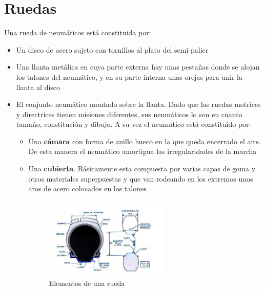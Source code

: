\documentclass[a4paper,12pt,oneside]{book}
\begin{document}
\section{Ruedas}
\label{sec:org46b1482}

Una rueda de neumáticos está constituida por:
\begin{itemize}
\item Un disco de acero sujeto con tornillos al plato del semi-palier
\item Una llanta metálica en cuya parte externa hay unas pestañas donde se alojan
los talones del neumático, y en su parte interna unas orejas para unir la
llanta al disco
\item El conjunto neumático montado sobre la llanta. Dado que las ruedas motrices y
directrices tienen misiones diferentes, sus neumáticos lo son en cuanto
tamaño, constitución y dibujo. A su vez el neumático está constituido por:
\begin{itemize}
\item Una \textbf{cámara} con forma de anillo hueco en la que queda encerrado el
aire. De esta manera el neumático amortigua las irregularidades de la marcha
\item Una \textbf{cubierta}. Básicamente esta compuesta por varias capas de
goma y otros materiales superpuestas y que van rodeando en los extremos unos
aros de acero colocados en los talones 

\begin{figure}[htbp]
\centering
\includegraphics[width=0.6\textwidth]{./img_0009/esquema_rueda.PNG}
\caption{Elementos de una rueda}
\end{figure}
\end{itemize}
\end{itemize}
\end{document}
